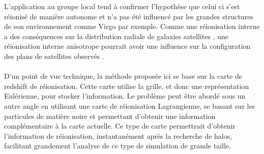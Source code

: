 L'application au groupe local tend à confirmer l'hypothèse que celui ci s'est réionisé de manière autonome et n'a pas été influencé par les grandes structures de son environnement comme Virgo par exemple.
Comme une réionisation interne a des conséquences sur la distribution radiale de galaxies satellites \citep{2011MNRAS.417L..93O}, une réionisation interne anisotrope pourrait avoir une influence sur la configuration des plans de satellites observés \citep{2015ApJ...800...34G}.

\paragraph{}
D'un point de vue technique, la méthode proposée ici se base sur la carte de redshift de réionisation.
Cette carte utilise la grille, et donc une représentation Eulérienne, pour stocker l'information. %
Le problème peut être abordé sous un autre angle en utilisant une carte de réionisation Lagrangienne, se basant sur les particules de matière noire et permettant d'obtenir une information complémentaire à la carte actuelle.
Ce type de carte permettrait d'obtenir l'information de réionisation, instantanément après la recherche de halos, facilitant grandement l'analyse de ce type de simulation de grande taille.